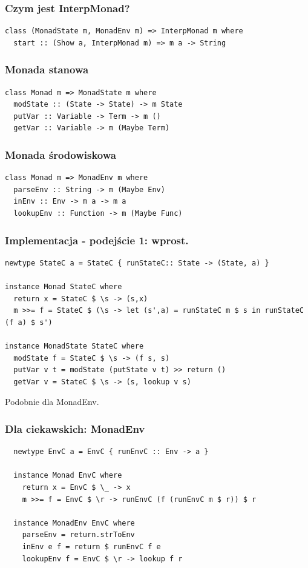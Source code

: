 \documentclass{beamer}
\begin{document}
\begin{frame}[fragile] %
  \frametitle{Czym jest InterpMonad?}
\begin{lstlisting}
class (MonadState m, MonadEnv m) => InterpMonad m where
  start :: (Show a, InterpMonad m) => m a -> String
\end{lstlisting}
\end{frame}

\begin{frame}[fragile] %
  \frametitle{Monada stanowa}
\begin{lstlisting}
class Monad m => MonadState m where
  modState :: (State -> State) -> m State
  putVar :: Variable -> Term -> m ()
  getVar :: Variable -> m (Maybe Term)
\end{lstlisting}
\end{frame}

\begin{frame}[fragile] %
  \frametitle{Monada środowiskowa}
\begin{lstlisting}
class Monad m => MonadEnv m where
  parseEnv :: String -> m (Maybe Env)
  inEnv :: Env -> m a -> m a
  lookupEnv :: Function -> m (Maybe Func)
\end{lstlisting}
\end{frame}

\begin{frame}[fragile] %
  \frametitle{Implementacja - podejście 1: wprost.}
\begin{lstlisting}
newtype StateC a = StateC { runStateC:: State -> (State, a) }

instance Monad StateC where
  return x = StateC $ \s -> (s,x) 
  m >>= f = StateC $ (\s -> let (s',a) = runStateC m $ s in runStateC (f a) $ s')

instance MonadState StateC where
  modState f = StateC $ \s -> (f s, s)
  putVar v t = modState (putState v t) >> return ()
  getVar v = StateC $ \s -> (s, lookup v s)
\end{lstlisting}
Podobnie dla MonadEnv.
\end{frame}

\begin{frame}[fragile] %
  \frametitle{Dla ciekawskich: MonadEnv}
  \begin{lstlisting}
  newtype EnvC a = EnvC { runEnvC :: Env -> a }

  instance Monad EnvC where
    return x = EnvC $ \_ -> x
    m >>= f = EnvC $ \r -> runEnvC (f (runEnvC m $ r)) $ r

  instance MonadEnv EnvC where
    parseEnv = return.strToEnv   
    inEnv e f = return $ runEnvC f e
    lookupEnv f = EnvC $ \r -> lookup f r 
  \end{lstlisting}
\end{frame}
\end{document}
